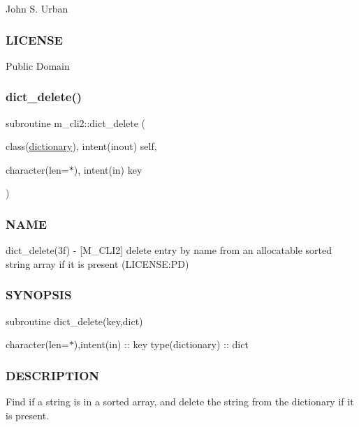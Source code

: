 John S. Urban \subsubsection*{L\+I\+C\+E\+N\+SE}

Public Domain \mbox{\label{namespacem__cli2_afcdd2c59305faf341ebf8ec3b115a05e}} 
\subsubsection{\texorpdfstring{dict\+\_\+delete()}{dict\_delete()}}
{\footnotesize\ttfamily subroutine m\+\_\+cli2\+::dict\+\_\+delete (\begin{DoxyParamCaption}\item[{class(\mbox{\hyperlink{structm__cli2_1_1dictionary}{dictionary}}), intent(inout)}]{self,  }\item[{character(len=$\ast$), intent(in)}]{key }\end{DoxyParamCaption})\hspace{0.3cm}{\ttfamily [private]}}



\subsubsection*{N\+A\+ME}

dict\+\_\+delete(3f) -\/ \mbox{[}M\+\_\+\+C\+L\+I2\mbox{]} delete entry by name from an allocatable sorted string array if it is present (L\+I\+C\+E\+N\+SE\+:PD) 

\subsubsection*{S\+Y\+N\+O\+P\+S\+IS}

subroutine dict\+\_\+delete(key,dict)

character(len=$\ast$),intent(in) \+:\+: key type(dictionary) \+:\+: dict

\subsubsection*{D\+E\+S\+C\+R\+I\+P\+T\+I\+ON}

\begin{DoxyVerb}Find if a string is in a sorted array, and delete the string
from the dictionary if it is present.
\end{DoxyVerb}


